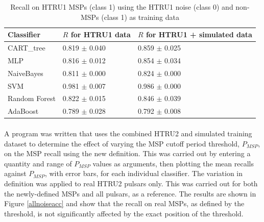 \documentclass[12pt]{article}
\begin{document}
\begin{table}[]
\centering
\begin{tabular}{|l|l|l|}
\hline
\textbf{Classifier} & \textbf{$R$ for HTRU1 data} & \textbf{$R$ for HTRU1 + simulated data} \\ \hline
CART\_tree          & 0.819 $\pm$ 0.040                & 0.859 $\pm$ 0.025                                 \\ \hline
MLP                 & 0.816 $\pm$ 0.012                & 0.854 $\pm$ 0.034                                 \\ \hline
NaiveBayes        & 0.811 $\pm$ 0.000                & 0.824 $\pm$ 0.000                                 \\ \hline
SVM                 & 0.981 $\pm$ 0.007                & 0.986 $\pm$ 0.000                                 \\ \hline
Random Forest      & 0.822 $\pm$ 0.015                & 0.846 $\pm$ 0.039                                 \\ \hline
AdaBoost            & 0.789 $\pm$ 0.028                & 0.792 $\pm$ 0.008                                 \\ \hline
\end{tabular}
\caption{Recall on HTRU1 MSPs (class 1) using the HTRU1 noise (class 0) and non-MSPs (class 1) as training data}
\label{HTRU1}
\end{table}

\paragraph{}
A program was written that uses the combined HTRU2 and simulated training dataset to determine the effect of varying the MSP cutoff period threshold, $P_{MSP}$, on the MSP recall using the new definition. This was carried out by entering a quantity and range of $P_{MSP}$ values as arguments, then plotting the mean recalls against $P_{MSP}$, with error bars, for each individual classifier. The variation in definition was applied to real HTRU2 pulsars only. This was carried out for both the newly-defined MSPs and all pulsars, as a reference. The results are shown in Figure \ref{allnoiseacc} and show that the recall on real MSPs, as defined by the threshold, is not significantly affected by the exact position of the threshold.
\end{document}
